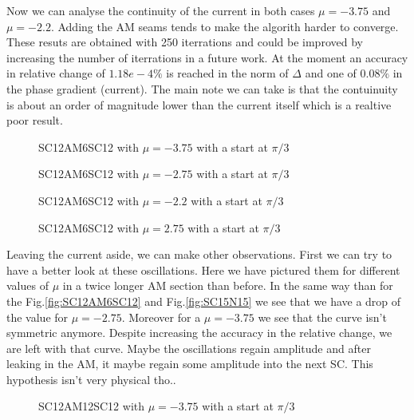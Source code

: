 \documentclass[../main.tex]{subfiles}
\begin{document}
Now we can analyse the continuity of the current in both cases $\mu=-3.75$ and $\mu=-2.2$. Adding the AM seams tends to make the algorith harder to converge. These resuts are obtained
with 250 iterrations and could be improved by increasing the number of iterrations in a future work. At the moment an accuracy in relative change of $1.18e-4\%$ is reached in the norm of $\Delta$ 
and one of $0.08\%$ in the phase gradient (current). The main note we can take is that the contuinuity is about an order of magnitude lower
than the current itself which is a realtive poor result.
\begin{figure}[H]
    \centering
    
    \caption{SC12AM6SC12 with $\mu=-3.75$ with a start at $\pi/3$}
\end{figure}

\begin{figure}[H]
    \centering
    
    \caption{SC12AM6SC12 with $\mu=-2.75$ with a start at $\pi/3$}
\end{figure}

\begin{figure}[H]
    \centering
    
    \caption{SC12AM6SC12 with $\mu=-2.2$ with a start at $\pi/3$}
\end{figure}
\begin{figure}[H]
    \centering
    
    \caption{SC12AM6SC12 with $\mu=2.75$ with a start at $\pi/3$}
\end{figure}
Leaving the current aside, we can make other observations. First we can try to have a better look at these oscillations. Here we have pictured them for different values of $\mu$ in a 
twice longer AM section than before. In the same way than for the Fig.\ref{fig:SC12AM6SC12} and Fig.\ref{fig:SC15N15} we see that we have a drop of the value for $\mu = -2.75$.
Moreover for a $\mu = -3.75$ we see that the curve isn't symmetric anymore. Despite increasing the accuracy in the relative change, we are left with that curve. Maybe the 
oscillations regain amplitude and after leaking in the AM, it maybe regain some amplitude into the next SC. This hypothesis isn't very physical tho..
\begin{figure}[H]
    \centering
    
    \caption{SC12AM12SC12 with $\mu=-3.75$ with a start at $\pi/3$}
\end{figure}
\end{document}
